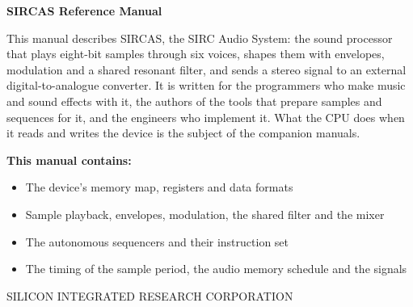 \clearpage
\thispagestyle{empty}
\begin{center}

	\vspace*{1.5cm}

	{\Large\bfseries SIRCAS Reference Manual}

	\vspace{1cm}

	\begin{minipage}{0.8\textwidth}
		This manual describes SIRCAS, the SIRC Audio System: the sound processor that plays eight-bit samples through six
		voices, shapes them with envelopes, modulation and a shared resonant filter, and sends a stereo signal to an external
		digital-to-analogue converter. It is written for the programmers who make music and sound effects with it, the authors
		of the tools that prepare samples and sequences for it, and the engineers who implement it. What the CPU does when it
		reads and writes the device is the subject of the companion manuals.

		\vspace{0.6cm}

		\textbf{This manual contains:}
		\begin{itemize}
			\item The device's memory map, registers and data formats
			\item Sample playback, envelopes, modulation, the shared filter and the mixer
			\item The autonomous sequencers and their instruction set
			\item The timing of the sample period, the audio memory schedule and the signals
		\end{itemize}
	\end{minipage}

	\vfill

	{\small SILICON INTEGRATED RESEARCH CORPORATION}

\end{center}
